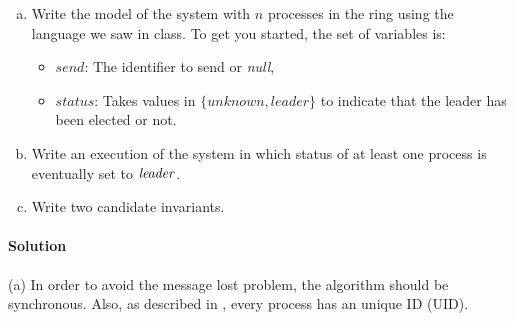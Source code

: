 \documentclass[11pt]{article}
\begin{document}
\begin{enumerate}[(a)]
\item Write the model of the system with $n$ processes in the ring using the language we saw in class. To get you started, the set of variables is:
\begin{itemize}
\item $\mathit{send}$: The identifier to send or {\em null\/},
\item $\mathit{status}$: Takes values in $\{ \mathit{unknown},\mathit{leader}\}$ to indicate that the leader has been elected or not.
\end{itemize}

\item Write an execution of the system in which status of at least one process is eventually set to $\mathit{leader\/}$.
\item Write two candidate invariants.
\end{enumerate}

\paragraph{Solution}

(a) In order to avoid the message lost problem, the algorithm should be synchronous. Also, as described in \cite{lynch1996a}, every process has an unique ID (UID).
\end{document}
